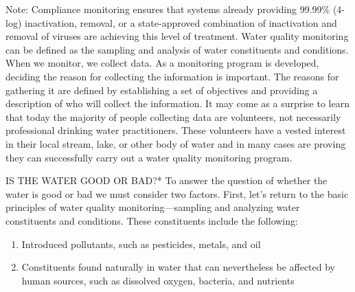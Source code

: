 \documentclass{article}
\begin{document}
Note: Compliance monitoring ensures that systems already providing
99.99\% (4-log) inactivation, removal, or a state-approved combination
of inactivation and removal of viruses are achieving this level of
treatment. Water quality monitoring can be defined as the sampling and
analysis of water constituents and conditions. When we monitor, we
collect data. As a monitoring program is developed, deciding the reason
for collecting the information is important. The reasons for gathering
it are defined by establishing a set of objectives and providing a
description of who will collect the information. It may come as a
surprise to learn that today the majority of people collecting data are
volunteers, not necessarily professional drinking water practitioners.
These volunteers have a vested interest in their local stream, lake, or
other body of water and in many cases are proving they can successfully
carry out a water quality monitoring program.

IS THE WATER GOOD OR BAD?* To answer the question of whether the water
is good or bad we must consider two factors. First, let's return to the
basic principles of water quality monitoring---sampling and analyzing
water constituents and conditions. These constituents include the
following:

\begin{enumerate}

\item
  Introduced pollutants, such as pesticides, metals, and oil
\item
  Constituents found naturally in water that can nevertheless be
  affected by human sources, such as dissolved oxygen, bacteria, and
  nutrients
\end{enumerate}
\end{document}
